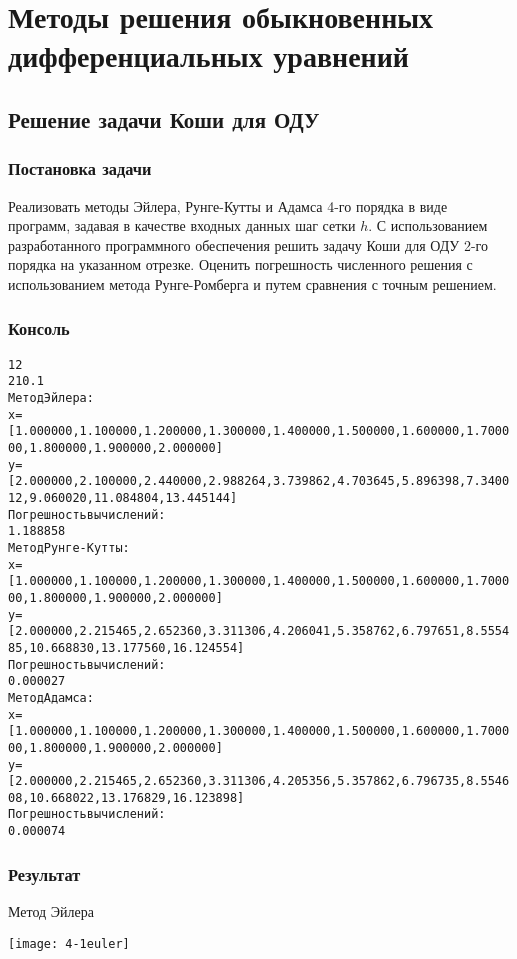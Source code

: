 \graphicspath{{images/}}

\section{Методы решения обыкновенных дифференциальных уравнений}

\subsection{Решение задачи Коши для ОДУ}

\subsubsection{Постановка задачи}
Реализовать методы Эйлера, Рунге-Кутты и Адамса 4-го порядка в виде программ, задавая в качестве входных данных шаг сетки $h$. С использованием разработанного программного обеспечения решить задачу Коши для ОДУ 2-го порядка на указанном отрезке. Оценить погрешность численного решения с использованием метода Рунге-Ромберга и путем сравнения с точным решением.

\subsubsection{Консоль}
\begin{alltt}
1 2
2 1 0.1
Метод Эйлера:
x = [1.000000, 1.100000, 1.200000, 1.300000, 1.400000, 1.500000, 1.600000, 1.700000, 1.800000, 1.900000, 2.000000]
y = [2.000000, 2.100000, 2.440000, 2.988264, 3.739862, 4.703645, 5.896398, 7.340012, 9.060020, 11.084804, 13.445144]
Погрешность вычислений:
1.188858
Метод Рунге-Кутты:
x = [1.000000, 1.100000, 1.200000, 1.300000, 1.400000, 1.500000, 1.600000, 1.700000, 1.800000, 1.900000, 2.000000]
y = [2.000000, 2.215465, 2.652360, 3.311306, 4.206041, 5.358762, 6.797651, 8.555485, 10.668830, 13.177560, 16.124554]
Погрешность вычислений:
0.000027
Метод Адамса:
x = [1.000000, 1.100000, 1.200000, 1.300000, 1.400000, 1.500000, 1.600000, 1.700000, 1.800000, 1.900000, 2.000000]
y = [2.000000, 2.215465, 2.652360, 3.311306, 4.205356, 5.357862, 6.796735, 8.554608, 10.668022, 13.176829, 16.123898]
Погрешность вычислений:
0.000074
\end{alltt}
\pagebreak

\subsubsection{Результат}
Метод Эйлера
\begin{center}
\texttt{[image: 4-1euler]}
\end{center}

